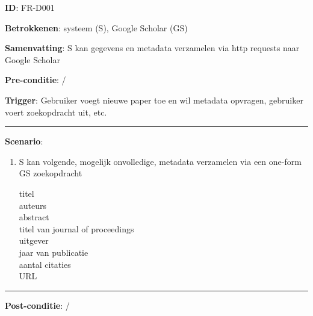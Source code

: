 \textbf{ID}: FR-D001
\vspace{2 mm}

\noindent \textbf{Betrokkenen}: systeem (S), Google Scholar (GS)
\vspace{2 mm}

\noindent \textbf{Samenvatting}: S kan gegevens en metadata verzamelen via http requests naar Google Scholar  
\vspace{2 mm}

\noindent \textbf{Pre-conditie}: /
\vspace{2 mm}

\noindent \textbf{Trigger}: Gebruiker voegt nieuwe paper toe en wil metadata opvragen, gebruiker voert zoekopdracht uit, etc.
\vspace{4 mm}

\hrule
\vspace{2 mm}
\noindent \textbf{Scenario}:
\begin{enumerate}
\item S kan volgende, mogelijk onvolledige, metadata verzamelen via een one-form GS zoekopdracht 
\begin{description}
  \item[titel]  \hfill
  \item[auteurs] \hfill 
   \item[abstract] \hfill
   \item[titel van journal of proceedings ] \hfill 
    \item[uitgever] \hfill 
   \item[jaar van publicatie] \hfill 
    \item[aantal citaties] \hfill
   \item[URL] \hfill 
  \end{description}
\end{enumerate}

\vspace{2 mm}
\hrule
\vspace{4 mm}


\noindent \textbf{Post-conditie}: / \\


\clearpage





